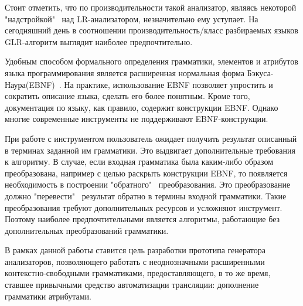 


Стоит отметить, что по производительности такой анализатор, являясь некоторой "надстройкой" \ над LR-анализатором, незначительно ему уступает. На сегодняшний день в соотношении производительность/класс разбираемых языков GLR-алгоритм выглядит наиболее предпочтительно.

Удобным способом формального определения грамматики, элементов и атрибутов языка программирования является расширенная нормальная форма Бэкуса-Наура(EBNF)~\cite{ISOEBNF}. На практике, использование EBNF позволяет упростить и сократить описание языка, сделать его более понятным. Кроме того, документация по языку, как правило, содержит конструкции EBNF. Однако многие современные инструменты не поддерживают EBNF-конструкции.

При работе с инструментом пользователь ожидает получить результат описанный в терминах заданной им грамматики. Это выдвигает дополнительные требования к алгоритму. В случае, если входная грамматика была каким-либо образом преобразована, например с целью раскрыть конструкции EBNF, то появляется необходимость в построении "обратного" \ преобразования. Это преобразование должно "перевести" \ результат обратно в термины входной грамматики. Такие преобразования  требуют дополнительных ресурсов и усложняют инструмент. Поэтому наиболее предпочтительными является алгоритмы, работающие без дополнительных преобразований грамматики.

В рамках данной работы ставится цель разработки прототипа генератора анализаторов, позволяющего работать с неоднозначными расширенными контекстно-свободными грамматиками, предоставляющего, в то же время, ставшее привычными средство автоматизации трансляции: дополнение грамматики атрибутами.
